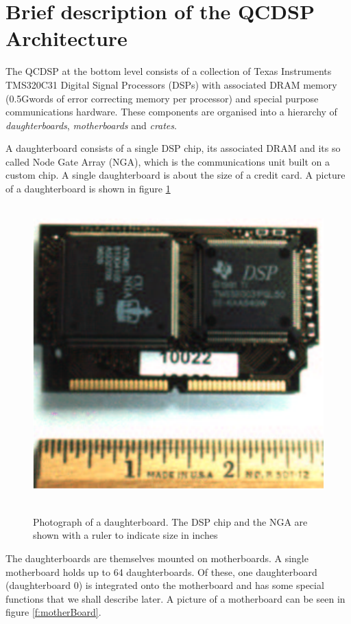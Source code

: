 \section{Brief description of the QCDSP Architecture}
The QCDSP at the bottom level consists of a collection of Texas
Instruments TMS320C31 Digital Signal Processors (DSPs) with associated
DRAM memory (0.5Gwords of error correcting memory per processor) and
special purpose communications hardware. These components are
organised into a hierarchy of {\em daughterboards}, {\em motherboards}
and {\em crates}.

A daughterboard consists of a single DSP chip, its associated DRAM and 
its so called Node Gate Array (NGA), which is the communications unit
built on a custom chip. A single daughterboard is about the size of a 
credit card. A picture of a daughterboard is shown in figure \ref{f:daughterBoard}
\begin{figure}[ht]
\begin{center}
\leavevmode
\hbox{%
\includegraphics{daughterboard_photo}
}
\end{center}
\caption{Photograph of a daughterboard. The DSP chip and the NGA are shown
with a ruler to indicate size in inches}
\label{f:daughterBoard}
\end{figure}

The daughterboards are themselves mounted on motherboards. A single
motherboard holds up to 64 daughterboards. Of these, one daughterboard
(daughterboard 0) is integrated onto the motherboard and has some 
special functions that we shall describe later. A picture of a motherboard 
can be seen in figure \ref{f:motherBoard}.

